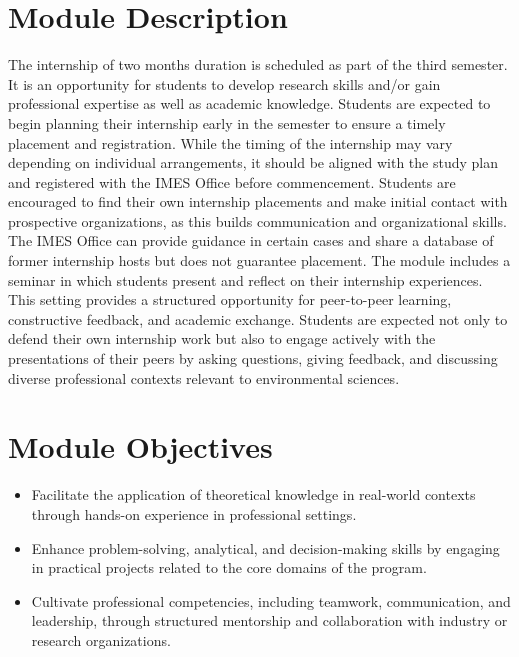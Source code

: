 \documentclass[
  letterpaper,
  10pt,
  openany]{book}
\providecommand{\tightlist}{%
  \setlength{\itemsep}{0pt}\setlength{\parskip}{0pt}}\usepackage{longtable,booktabs,array}
\begin{document}
\section*{Module Description}\label{module-description-6}


The internship of two months duration is scheduled as part of the third
semester. It is an opportunity for students to develop research skills
and/or gain professional expertise as well as academic knowledge.
Students are expected to begin planning their internship early in the
semester to ensure a timely placement and registration. While the timing
of the internship may vary depending on individual arrangements, it
should be aligned with the study plan and registered with the IMES
Office before commencement. Students are encouraged to find their own
internship placements and make initial contact with prospective
organizations, as this builds communication and organizational skills.
The IMES Office can provide guidance in certain cases and share a
database of former internship hosts but does not guarantee placement.
The module includes a seminar in which students present and reflect on
their internship experiences. This setting provides a structured
opportunity for peer-to-peer learning, constructive feedback, and
academic exchange. Students are expected not only to defend their own
internship work but also to engage actively with the presentations of
their peers by asking questions, giving feedback, and discussing diverse
professional contexts relevant to environmental sciences.

\section*{Module Objectives}\label{module-objectives-5}


\begin{itemize}
\tightlist
\item
  Facilitate the application of theoretical knowledge in real-world
  contexts through hands-on experience in professional settings.
\item
  Enhance problem-solving, analytical, and decision-making skills by
  engaging in practical projects related to the core domains of the
  program.
\item
  Cultivate professional competencies, including teamwork,
  communication, and leadership, through structured mentorship and
  collaboration with industry or research organizations.
\end{itemize}
\end{document}
